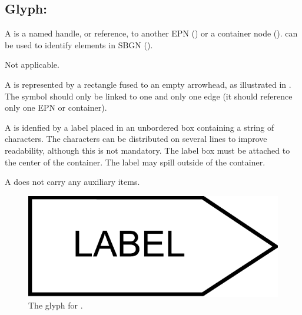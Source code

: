 
\subsection{Glyph: }
\label{sec:tag}

A  is a named handle, or reference, to another EPN () or a container node ().   can be used to identify elements in SBGN  ().

\begin{glyphDescription}

\glyphSboTerm Not applicable.

\glyphContainer A  is represented by a rectangle fused to an empty arrowhead, as illustrated in .  The symbol should only be linked to one and only one edge (\ie it should reference only one EPN or container).

\glyphLabel A  is idenfied by a label placed in an unbordered box containing a string of characters.  The characters can be distributed on several lines to improve readability, although this is not mandatory.  The label box must be attached to the center of the container.  The label may spill outside of the container.

\glyphAux A  does not carry any auxiliary items. 

\end{glyphDescription}

\begin{figure}[H]
  \centering
  \includegraphics[scale = 0.3]{images/tag}
  \caption{The \PD glyph for .}
  \label{fig:tag}
\end{figure}





